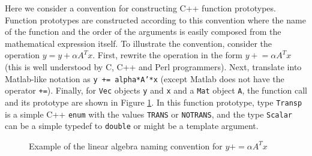 \documentclass[acmtoms,acmnow]{acmtrans2m}
\begin{document}
Here we consider a convention for constructing C++ function prototypes.
Function prototypes are constructed according to this convention where the
name of the function and the order of the arguments is easily composed from
the mathematical expression itself.  To illustrate the convention, consider
the operation $y = y + \alpha A^T x$.  First, rewrite the operation in the
form $y +\!= \alpha A^T x$ (this is well understood by C, C++ and Perl
programmers).  Next, translate into Matlab-like notation as {}\texttt{y +=
alpha*A'*x} (except Matlab does not have the operator {}\texttt{+=}).
Finally, for {}\texttt{Vec} objects {}\texttt{y} and {}\texttt{x} and a
{}\texttt{Mat} object {}\texttt{A}, the function call and its prototype are
shown in Figure {}\ref{rsqppp:fig:example_linalgpack_convention}.  In this
function prototype, type {}\texttt{Transp} is a simple C++ {}\texttt{enum}
with the values {}\texttt{TRANS} or {}\texttt{NOTRANS}, and the type
{}\texttt{Scalar} can be a simple typedef to {}\texttt{double} or might be a
template argument.

{\bsinglespace
\begin{figure}
\caption[Example of naming convention for functions for linear algebra function]{
\label{rsqppp:fig:example_linalgpack_convention}
Example of the linear algebra naming convention for $y += \alpha A^T x$
}
\end{figure}
\esinglespace}
\end{document}
